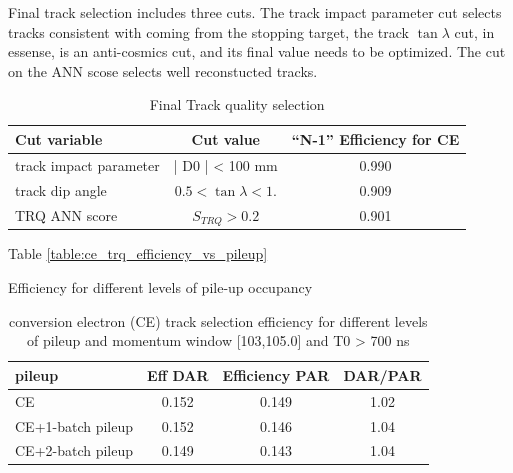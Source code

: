 Final track selection includes three cuts. The track impact parameter cut selects tracks consistent 
with coming from the stopping target, the track $\tan\lambda$ cut, in essense, is an anti-cosmics cut, and 
its final value needs to be optimized. The cut on the ANN scose selects well reconstucted tracks.

\begin{table}[h!]
  \begin{center}
    \caption{Final Track quality selection}
    \label{tab:table1}
    \begin{tabular}{l|c|c} %
      \textbf{Cut variable} & \textbf{Cut value} & \textbf{``N-1'' Efficiency for CE}\\
      \hline
      track impact parameter & | D0 | < 100 mm           &   0.990    \\
      track dip angle        & $ 0.5< \tan \lambda < 1.$ &   0.909    \\
      TRQ ANN score          & $S_{TRQ} > 0.2$            &   0.901    \\
    \end{tabular}
  \end{center}
\end{table}

Table \ref{table:ce_trq_efficiency_vs_pileup}

\begin{table}[h!]
  \label{table:ce_trq_efficiency_vs_pileup_1} 
  \begin{center}
    \caption{Efficiency for different levels of pile-up occupancy}
    \label{tab:table1}
    \begin{tabular}{l|c|c|c} %
      \textbf{pileup}    & Eff DAR &  Efficiency PAR  &  DAR/PAR   \\
      \hline                                                           
      CE                 &  0.152  &   0.149          &  1.02      \\
      CE+1-batch pileup  &  0.152  &   0.146          &  1.04      \\
      CE+2-batch pileup  &  0.149  &   0.143          &  1.04      \\
    \end{tabular}
  \end{center}
  \caption{
    conversion electron (CE) track selection efficiency for different levels of pileup and momentum window [103,105.0]  
    and T0 > 700 ns
  }
\end{table}


